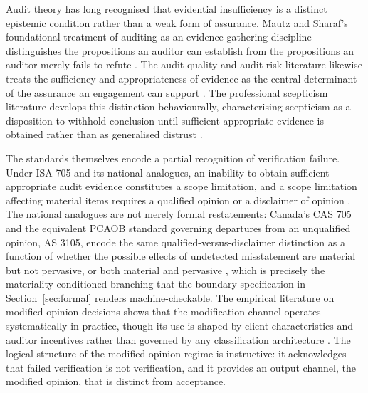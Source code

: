 \documentclass[11pt,a4paper]{article}
\theoremstyle{definition}
\theoremstyle{remark}
\begin{document}
Audit theory has long recognised that evidential insufficiency is a distinct epistemic condition rather than a weak form of assurance. Mautz and Sharaf's foundational treatment of auditing as an evidence-gathering discipline distinguishes the propositions an auditor can establish from the propositions an auditor merely fails to refute \citep{mautz1961}. The audit quality and audit risk literature likewise treats the sufficiency and appropriateness of evidence as the central determinant of the assurance an engagement can support \citep{knechel2013}. The professional scepticism literature develops this distinction behaviourally, characterising scepticism as a disposition to withhold conclusion until sufficient appropriate evidence is obtained rather than as generalised distrust \citep{nelson2009, hurtt2010}.

The standards themselves encode a partial recognition of verification failure. Under ISA 705 and its national analogues, an inability to obtain sufficient appropriate audit evidence constitutes a scope limitation, and a scope limitation affecting material items requires a qualified opinion or a disclaimer of opinion \citep{isa705}. The national analogues are not merely formal restatements: Canada's CAS 705 and the equivalent PCAOB standard governing departures from an unqualified opinion, AS 3105, encode the same qualified-versus-disclaimer distinction as a function of whether the possible effects of undetected misstatement are material but not pervasive, or both material and pervasive \citep{cas705, pcaob3105}, which is precisely the materiality-conditioned branching that the boundary specification in Section~\ref{sec:formal} renders machine-checkable. The empirical literature on modified opinion decisions shows that the modification channel operates systematically in practice, though its use is shaped by client characteristics and auditor incentives rather than governed by any classification architecture \citep{habib2013}. The logical structure of the modified opinion regime is instructive: it acknowledges that failed verification is not verification, and it provides an output channel, the modified opinion, that is distinct from acceptance.
\end{document}
